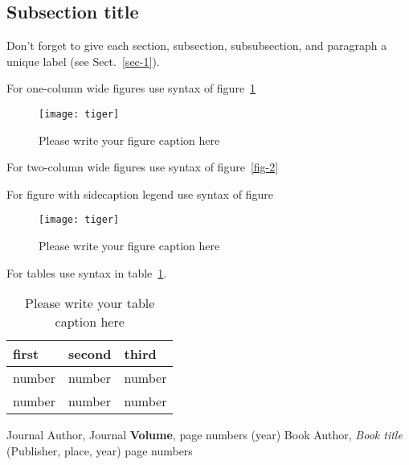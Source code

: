 \documentclass{webofc}
\begin{document}
\subsection{Subsection title}
\label{sec-2}
Don't forget to give each section, subsection, subsubsection, and
paragraph a unique label (see Sect.~\ref{sec-1}).

For one-column wide figures use syntax of figure~\ref{fig-1}
\begin{figure}[h]
\centering
\texttt{[image: tiger]}
\caption{Please write your figure caption here}
\label{fig-1}       %
\end{figure}

For two-column wide figures use syntax of figure~\ref{fig-2}
\begin{figure*}
\centering
\vspace*{5cm}       %
\caption{Please write your figure caption here}
\label{fig-2}       %
\end{figure*}

For figure with sidecaption legend use syntax of figure
\begin{figure}
\centering
\sidecaption
\texttt{[image: tiger]}
\caption{Please write your figure caption here}
\label{fig-3}       %
\end{figure}

For tables use syntax in table~\ref{tab-1}.
\begin{table}
\centering
\caption{Please write your table caption here}
\label{tab-1}       %
\begin{tabular}{lll}
\hline
first & second & third  \\\hline
number & number & number \\
number & number & number \\\hline
\end{tabular}
\vspace*{5cm}  %
\end{table}
%
% 
%
%
\begin{thebibliography}{}
%
%
Journal Author, Journal \textbf{Volume}, page numbers (year)
Book Author, \textit{Book title} (Publisher, place, year) page numbers
\end{thebibliography}
\end{document}
